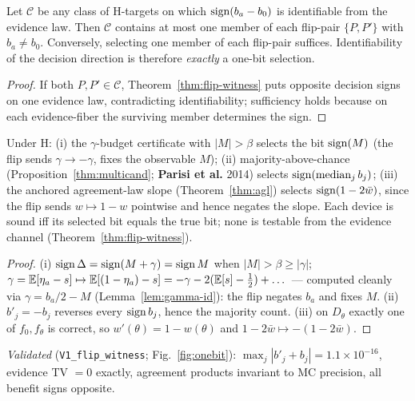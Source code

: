 \begin{theorem}\label{thm:bit-necessity}
Let $\mathcal C$ be any class of H-targets on which $\operatorname{sign}(b_a-b_0)$ is identifiable
from the evidence law. Then $\mathcal C$ contains at most one member of each flip-pair
$\{P,P'\}$ with $b_a\neq b_0$. Conversely, selecting one member of each flip-pair
suffices. Identifiability of the decision direction is therefore \emph{exactly} a
one-bit selection.
\end{theorem}

\begin{proof}
If both $P,P'\in\mathcal C$, Theorem~\ref{thm:flip-witness} puts opposite decision signs
on one evidence law, contradicting identifiability; sufficiency holds because on each
evidence-fiber the surviving member determines the sign.
\end{proof}

\begin{theorem}\label{thm:bit-dictionary}
Under H: (i) the $\gamma$-budget certificate with $|M|>\beta$ selects the bit
$\operatorname{sign}(M)$ (the flip sends $\gamma\to-\gamma$, fixes the observable $M$); (ii)
majority-above-chance (Proposition~\ref{thm:multicand}; \textbf{Parisi et al.} 2014)
selects $\operatorname{sign}(\mathrm{median}_j\,b_j)$; (iii) the anchored agreement-law slope
(Theorem~\ref{thm:agl}) selects $\operatorname{sign}(1-2\bar w)$, since the flip sends $w\mapsto1-w$
pointwise and hence negates the slope. Each device is sound iff its selected bit equals
the true bit; none is testable from the evidence channel
(Theorem~\ref{thm:flip-witness}).
\end{theorem}

\begin{proof}
(i) $\operatorname{sign}\Delta=\operatorname{sign}(M+\gamma)=\operatorname{sign} M$ when $|M|>\beta\ge|\gamma|$;
$\gamma=\mathbb{E}[\eta_a-s]\mapsto\mathbb{E}[(1-\eta_a)-s]=-\gamma-2(\mathbb{E}[s]-\tfrac12)+\dots$ --- computed
cleanly via $\gamma=b_a/2-M$ (Lemma~\ref{lem:gamma-id}): the flip negates $b_a$ and fixes
$M$. (ii) $b'_j=-b_j$ reverses every $\operatorname{sign} b_j$, hence the majority count. (iii) on
$D_\theta$ exactly one of $f_0,f_\theta$ is correct, so $w'(\theta)=1-w(\theta)$ and
$1-2\bar w\mapsto-(1-2\bar w)$.
\end{proof}

\noindent\emph{Validated} (\texttt{V1\_flip\_witness}; Fig.~\ref{fig:onebit}):
$\max_j|b'_j+b_j|=1.1\times10^{-16}$, evidence TV $=0$ exactly, agreement products
invariant to MC precision, all benefit signs opposite.

